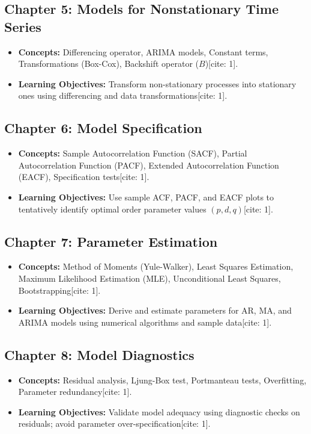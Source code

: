 \documentclass{article}
\begin{document}
\subsection*{Chapter 5: Models for Nonstationary Time Series}
\begin{itemize}
    \item \textbf{Concepts:} Differencing operator, ARIMA models, Constant terms, Transformations (Box-Cox), Backshift operator ($B$)[cite: 1].
    \item \textbf{Learning Objectives:} Transform non-stationary processes into stationary ones using differencing and data transformations[cite: 1].
\end{itemize}

\subsection*{Chapter 6: Model Specification}
\begin{itemize}
    \item \textbf{Concepts:} Sample Autocorrelation Function (SACF), Partial Autocorrelation Function (PACF), Extended Autocorrelation Function (EACF), Specification tests[cite: 1].
    \item \textbf{Learning Objectives:} Use sample ACF, PACF, and EACF plots to tentatively identify optimal order parameter values $(p, d, q)$[cite: 1].
\end{itemize}

\subsection*{Chapter 7: Parameter Estimation}
\begin{itemize}
    \item \textbf{Concepts:} Method of Moments (Yule-Walker), Least Squares Estimation, Maximum Likelihood Estimation (MLE), Unconditional Least Squares, Bootstrapping[cite: 1].
    \item \textbf{Learning Objectives:} Derive and estimate parameters for AR, MA, and ARIMA models using numerical algorithms and sample data[cite: 1].
\end{itemize}

\subsection*{Chapter 8: Model Diagnostics}
\begin{itemize}
    \item \textbf{Concepts:} Residual analysis, Ljung-Box test, Portmanteau tests, Overfitting, Parameter redundancy[cite: 1].
    \item \textbf{Learning Objectives:} Validate model adequacy using diagnostic checks on residuals; avoid parameter over-specification[cite: 1].
\end{itemize}
\end{document}
